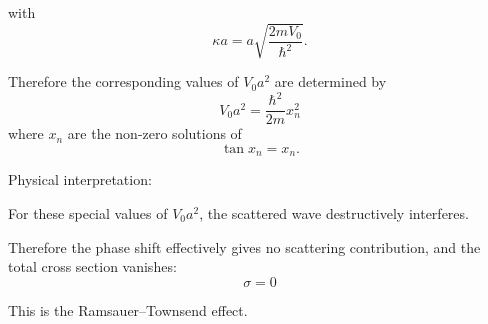 \documentclass[11pt,a4paper]{scrartcl}
\begin{document}
\begin{enumerate}
\begin{enumerate}
\begin{calculationbox}
                        with
                        \[
                        \kappa a
                        =
                        a\sqrt{\frac{2mV_0}{\hbar^2}}.
                        \]

                        Therefore the corresponding values of $V_0a^2$ are determined by
                        \[
                        \boxed{
                        V_0a^2
                        =
                        \frac{\hbar^2}{2m}x_n^2
                        }
                        \]
                        where $x_n$ are the non-zero solutions of
                        \[
                        \tan x_n = x_n.
                        \]
                    \end{calculationbox}

                    Physical interpretation:
                    \begin{calculationbox}
                        For these special values of $V_0a^2$, the scattered wave destructively interferes.

                        Therefore the phase shift effectively gives no scattering contribution, and the total cross section vanishes:
                        \[
                        \boxed{
                        \sigma = 0
                        }
                        \]

                        This is the Ramsauer--Townsend effect.
                    \end{calculationbox}
            \end{enumerate}
        

\end{enumerate}
\end{document}
